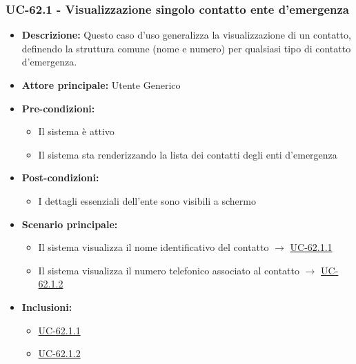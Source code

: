 \documentclass[a4paper,12pt]{article}
\begin{document}
\subsubsection{UC-62.1 - Visualizzazione singolo contatto ente d'emergenza} \label{subsec:UC-62.1}
\begin{itemize}
    \item \textbf{Descrizione:} Questo caso d'uso generalizza la visualizzazione di un contatto, definendo la struttura comune (nome e numero) per qualsiasi tipo di contatto d'emergenza.
    \item \textbf{Attore principale:} Utente Generico
    \item \textbf{Pre-condizioni:} 
    \begin{itemize}
        \item Il sistema è attivo
        \item Il sistema sta renderizzando la lista dei contatti degli enti d'emergenza
    \end{itemize}
    \item \textbf{Post-condizioni:}
    \begin{itemize}
        \item I dettagli essenziali dell'ente sono visibili a schermo
    \end{itemize}
    \item \textbf{Scenario principale:} 
    \begin{itemize}
        \item Il sistema visualizza il nome identificativo del contatto $\rightarrow$ \hyperref[subsec:UC-62.1.1]{UC-62.1.1}
        \item Il sistema visualizza il numero telefonico associato al contatto $\rightarrow$ \hyperref[subsec:UC-62.1.2]{UC-62.1.2}
    \end{itemize}
    \item \textbf{Inclusioni:}
    \begin{itemize}
        \item \hyperref[subsec:UC-62.1.1]{UC-62.1.1}
        \item \hyperref[subsec:UC-62.1.2]{UC-62.1.2}
    \end{itemize}
\end{itemize}
\end{document}
